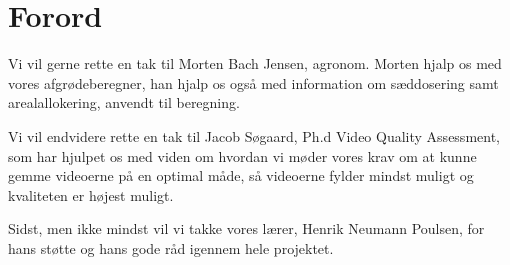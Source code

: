 \section{Forord}
Vi vil gerne rette en tak til Morten Bach Jensen, agronom. Morten hjalp os med vores afgrødeberegner, han hjalp os også med information om sæddosering samt arealallokering, anvendt til beregning.

Vi vil endvidere rette en tak til Jacob Søgaard, Ph.d Video Quality Assessment, som har hjulpet os med viden om hvordan vi møder vores krav om at kunne gemme videoerne på en optimal måde, så videoerne fylder mindst muligt og kvaliteten er højest muligt.

Sidst, men ikke mindst vil vi takke vores lærer, Henrik Neumann Poulsen, for hans støtte og hans gode råd igennem hele projektet.